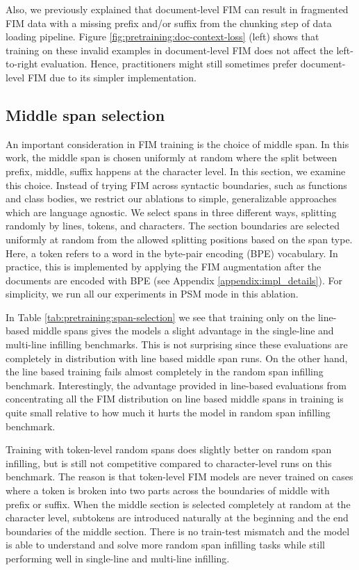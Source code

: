 \documentclass[postscript]{article}
\begin{document}
Also, we previously explained that document-level FIM can result in fragmented FIM data with a missing prefix and/or suffix from the chunking step of data loading pipeline. Figure \ref{fig:pretraining:doc-context-loss} (left) shows that training on these invalid examples in document-level FIM does not affect the left-to-right evaluation. Hence, practitioners might  still sometimes prefer document-level FIM due to its simpler implementation.


\subsection{Middle span selection}
\label{sec:pretraining:span}

An important consideration in FIM training is the choice of middle span. In this work, the middle span is chosen uniformly at random where the split between prefix, middle, suffix happens at the character level. In this section, we examine this choice. Instead of trying FIM across syntactic boundaries, such as functions and class bodies, we restrict our ablations to simple, generalizable approaches which are language agnostic. We select spans in three different ways, splitting randomly by lines, tokens, and characters. The section boundaries are selected uniformly at random from the allowed splitting positions based on the span type. Here, a token refers to a word in the byte-pair encoding (BPE) vocabulary. In practice, this is implemented by applying the FIM augmentation after the documents are encoded with BPE (see Appendix \ref{appendix:impl_details}). For simplicity, we run all our experiments in PSM mode in this ablation.


In Table \ref{tab:pretraining:span-selection} we see that training only on the line-based middle spans gives the models a slight advantage in the single-line and multi-line infilling benchmarks. This is not surprising since these evaluations are completely in distribution with line based middle span runs. On the other hand, the line based training fails almost completely in the random span infilling benchmark. Interestingly, the advantage provided in line-based evaluations from concentrating all the FIM distribution on line based middle spans in training is quite small relative to how much it hurts the model in random span infilling benchmark.

Training with token-level random spans does slightly better on random span infilling, but is still not competitive compared to character-level runs on this benchmark. The reason is that token-level FIM models  are never trained on cases where a token is broken into two parts across the boundaries of middle with prefix or suffix. When the middle section is selected completely at random at the character level, subtokens are introduced naturally at the beginning and the end boundaries of the middle section. There is no train-test mismatch and the model is able to understand and solve more random span infilling tasks while still performing well in single-line and multi-line infilling.
\end{document}
